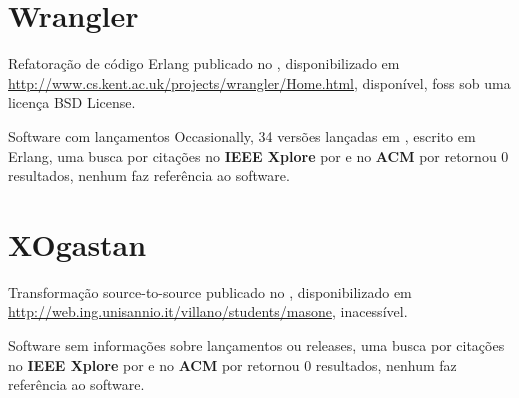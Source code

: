 \section{Wrangler}

Refatoração de código Erlang
publicado no  ,
disponibilizado em \url{http://www.cs.kent.ac.uk/projects/wrangler/Home.html},
disponível,
foss
sob uma licença BSD License.

Software com lançamentos Occasionally,
34 versões lançadas
em ,
escrito em Erlang,
uma busca por citações no {\bf IEEE Xplore} por
\texttt{}
e no {\bf ACM} por
\texttt{}
retornou
0 resultados,
nenhum faz referência ao software.



\section{XOgastan}

Transformação source-to-source
publicado no  ,
disponibilizado em \url{http://web.ing.unisannio.it/villano/students/masone},
inacessível.

Software sem informações sobre lançamentos ou releases,
uma busca por citações no {\bf IEEE Xplore} por
\texttt{}
e no {\bf ACM} por
\texttt{}
retornou
0 resultados,
nenhum faz referência ao software.




